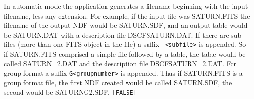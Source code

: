 {{{{         In automatic mode the application generates a filename
         beginning with the input filename, less any extension.  For
         example, if the input file was SATURN.FITS the filename of the
         output NDF would be SATURN.SDF, and an output table would be
         SATURN.DAT with a description file DSCFSATURN.DAT.  If there
         are sub-files (more than one FITS object in the file) a suffix
         {\tt \_<subfile>} is appended.  So if SATURN.FITS comprised a simple
         file followed by a table, the table would be called
         SATURN\_2.DAT and the description file DSCFSATURN\_2.DAT.  For
         group format a suffix {\tt G<groupnumber>} is appended.  Thus if
         SATURN.FITS is a group format file, the first NDF created
         would be called SATURN.SDF, the second would be SATURNG2.SDF.
         {\tt [FALSE]}
      }
      }}}
